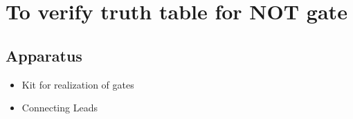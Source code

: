 \chapter{To verify truth table for NOT gate}


\section{Apparatus}
	\begin{itemize}
		\tightlist
		\item Kit for realization of gates
		\item Connecting Leads
	\end{itemize}

